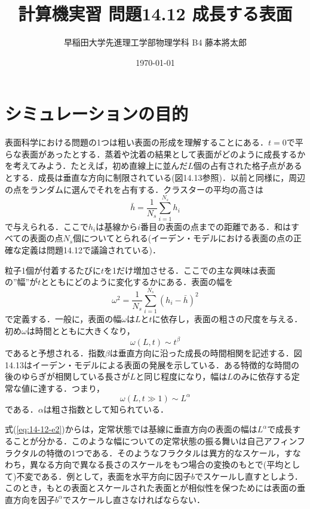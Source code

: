\documentclass{jsarticle}
\title{計算機実習 問題14.12 成長する表面}
\author{早稲田大学先進理工学部物理学科 B4 藤本將太郎}
\date{\today}
\begin{document}
\maketitle
    
\section{シミュレーションの目的}
    表面科学における問題の1つは粗い表面の形成を理解することにある．$t=0$で平らな表面があったとする．蒸着や沈着の結果として表面がどのように成長するかを考えてみよう．たとえば，初め直線上に並んだ$L$個の占有された格子点があるとする．成長は垂直な方向に制限されている(図14.13参照)．以前と同様に，周辺の点をランダムに選んでそれを占有する．クラスターの平均の高さは
    \begin{equation}
        \bar{h} = \frac{1}{N_{s}}\sum_{i=1}^{N_{s}}h_{i}
    \end{equation}
    で与えられる．ここで$h_{i}$は基線から$i$番目の表面の点までの距離である．和はすべての表面の点$N_{s}$個についてとられる(イーデン・モデルにおける表面の点の正確な定義は問題14.12で議論されている)．
    
    粒子1個が付着するたびに$t$を1だけ増加させる．ここでの主な興味は表面の”幅”が$t$とともにどのように変化するかにある．表面の幅を
    \begin{equation}
        \omega^{2} = \frac{1}{N_{s}}\sum_{i=1}^{N_{s}}(h_{i}-\bar{h})^{2}
    \end{equation}
    で定義する．一般に，表面の幅$\omega$は$L$と$t$に依存し，表面の粗さの尺度を与える．初め$\omega$は時間とともに大きくなり，
    \begin{equation}
        \omega(L,t) \sim t^{\beta}
    \end{equation}
    であると予想される．指数$\beta$は垂直方向に沿った成長の時間相関を記述する．図14.13はイーデン・モデルによる表面の発展を示している．ある特徴的な時間の後のゆらぎが相関している長さが$L$と同じ程度になり，幅は$L$のみに依存する定常な値に達する．つまり，
    \begin{equation}
        \omega(L, t \gg 1) \sim L^{\alpha}
        \label{eq:14-12-e2}
    \end{equation}
    である．$\alpha$は粗さ指数として知られている．
    
    式(\ref{eq:14-12-e2})からは，定常状態では基線に垂直方向の表面の幅は$L^{\alpha}$で成長することが分かる．このような幅についての定常状態の振る舞いは自己アフィンフラクタルの特徴の1つである．そのようなフラクタルは異方的なスケール，すなわち，異なる方向で異なる長さのスケールをもつ場合の変換のもとで(平均として)不変である．例として，表面を水平方向に因子$b$でスケールし直すとしよう．このとき，もとの表面とスケールされた表面とが相似性を保つためには表面の垂直方向を因子$b^{\alpha}$でスケールし直さなければならない．
    
\end{document}
